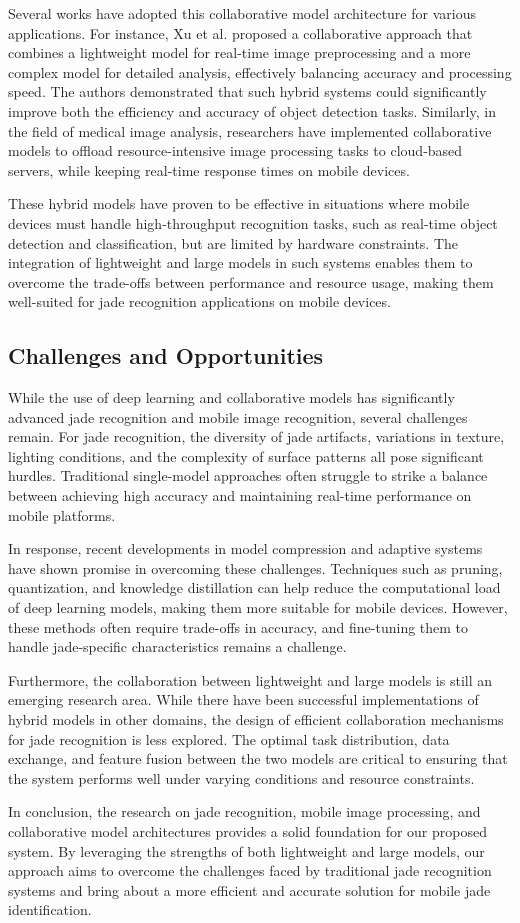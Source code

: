 Several works have adopted this collaborative model architecture for various applications. For instance, Xu et al. proposed a collaborative approach that combines a lightweight model for real-time image preprocessing and a more complex model for detailed analysis, effectively balancing accuracy and processing speed. The authors demonstrated that such hybrid systems could significantly improve both the efficiency and accuracy of object detection tasks. Similarly, in the field of medical image analysis, researchers have implemented collaborative models to offload resource-intensive image processing tasks to cloud-based servers, while keeping real-time response times on mobile devices.

These hybrid models have proven to be effective in situations where mobile devices must handle high-throughput recognition tasks, such as real-time object detection and classification, but are limited by hardware constraints. The integration of lightweight and large models in such systems enables them to overcome the trade-offs between performance and resource usage, making them well-suited for jade recognition applications on mobile devices.

\subsection{Challenges and Opportunities}

While the use of deep learning and collaborative models has significantly advanced jade recognition and mobile image recognition, several challenges remain. For jade recognition, the diversity of jade artifacts, variations in texture, lighting conditions, and the complexity of surface patterns all pose significant hurdles. Traditional single-model approaches often struggle to strike a balance between achieving high accuracy and maintaining real-time performance on mobile platforms.

In response, recent developments in model compression and adaptive systems have shown promise in overcoming these challenges. Techniques such as pruning, quantization, and knowledge distillation can help reduce the computational load of deep learning models, making them more suitable for mobile devices. However, these methods often require trade-offs in accuracy, and fine-tuning them to handle jade-specific characteristics remains a challenge.

Furthermore, the collaboration between lightweight and large models is still an emerging research area. While there have been successful implementations of hybrid models in other domains, the design of efficient collaboration mechanisms for jade recognition is less explored. The optimal task distribution, data exchange, and feature fusion between the two models are critical to ensuring that the system performs well under varying conditions and resource constraints.

In conclusion, the research on jade recognition, mobile image processing, and collaborative model architectures provides a solid foundation for our proposed system. By leveraging the strengths of both lightweight and large models, our approach aims to overcome the challenges faced by traditional jade recognition systems and bring about a more efficient and accurate solution for mobile jade identification.